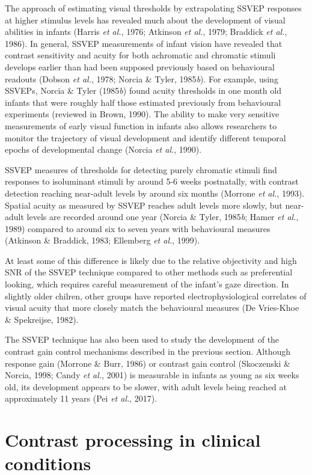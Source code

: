 \documentclass[
  letterpaper,
  DIV=11,
  numbers=noendperiod]{scrartcl}
\begin{document}
The approach of estimating visual thresholds by extrapolating SSVEP
responses at higher stimulus levels has revealed much about the
development of visual abilities in infants (Harris \emph{et al.}, 1976;
Atkinson \emph{et al.}, 1979; Braddick \emph{et al.}, 1986). In general,
SSVEP measurements of infant vision have revealed that contrast
sensitivity and acuity for both achromatic and chromatic stimuli
develops earlier than had been supposed previously based on behavioural
readouts (Dobson \emph{et al.}, 1978; Norcia \& Tyler, 1985\emph{b}).
For example, using SSVEPs, Norcia \& Tyler (1985\emph{b}) found acuity
thresholds in one month old infants that were roughly half those
estimated previously from behavioural experiments (reviewed in Brown,
1990). The ability to make very sensitive measurements of early visual
function in infants also allows researchers to monitor the trajectory of
visual development and identify different temporal epochs of
developmental change (Norcia \emph{et al.}, 1990).

SSVEP measures of thresholds for detecting purely chromatic stimuli find
responses to isoluminant stimuli by around 5-6 weeks postnatally, with
contrast detection reaching near-adult levels by around six months
(Morrone \emph{et al.}, 1993). Spatial acuity as measured by SSVEP
reaches adult levels more slowly, but near-adult levels are recorded
around one year (Norcia \& Tyler, 1985\emph{b}; Hamer \emph{et al.},
1989) compared to around six to seven years with behavioural measures
(Atkinson \& Braddick, 1983; Ellemberg \emph{et al.}, 1999).

At least some of this difference is likely due to the relative
objectivity and high SNR of the SSVEP technique compared to other
methods such as preferential looking, which requires careful measurement
of the infant's gaze direction. In slightly older chilren, other groups
have reported electrophysiological correlates of visual acuity that more
closely match the behavioural measures (De Vries-Khoe \& Spekreijse,
1982).

The SSVEP technique has also been used to study the development of the
contrast gain control mechanisms described in the previous section.
Although response gain (Morrone \& Burr, 1986) or contrast gain control
(Skoczenski \& Norcia, 1998; Candy \emph{et al.}, 2001) is measurable in
infants as young as six weeks old, its development appears to be slower,
with adult levels being reached at approximately 11 years (Pei \emph{et
al.}, 2017).

\section{Contrast processing in clinical
conditions}\label{contrast-processing-in-clinical-conditions}
\end{document}

